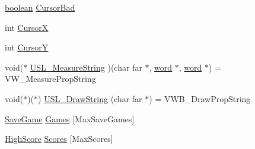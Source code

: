 \begin{DoxyCompactItemize}
\item 
\hyperlink{ID__HEAD_8H_a7c6368b321bd9acd0149b030bb8275ed}{boolean} \hyperlink{ID__US__1_8C_abf5358251c5b519d71e3d8bca8256510}{CursorBad}
\item 
int \hyperlink{ID__US__1_8C_af51730b2758fe5daa55ca8445a8f7c3b}{CursorX}
\item 
int \hyperlink{ID__US__1_8C_a7f5c998973d0526fcb8d52f37e5547da}{CursorY}
\item 
void($\ast$ \hyperlink{ID__US__1_8C_ac392829f8abc2e03447a6abf023352b1}{USL\_\-MeasureString} )(char far $\ast$, \hyperlink{ID__HEAD_8H_abad51e07ab6d26bec9f1f786c8d65bcd}{word} $\ast$, \hyperlink{ID__HEAD_8H_abad51e07ab6d26bec9f1f786c8d65bcd}{word} $\ast$) = VW\_\-MeasurePropString
\item 
void($\ast$)($\ast$) \hyperlink{ID__US__1_8C_a49825cde2ac607e0d17407fb33f14a00}{USL\_\-DrawString} (char far $\ast$) = VWB\_\-DrawPropString
\item 
\hyperlink{structSaveGame}{SaveGame} \hyperlink{ID__US__1_8C_a155f9931f0842c8f97f962eef9cd22f7}{Games} \mbox{[}MaxSaveGames\mbox{]}
\item 
\hyperlink{structHighScore}{HighScore} \hyperlink{ID__US__1_8C_a21091ead46c77ab22e506731e48c8d5e}{Scores} \mbox{[}MaxScores\mbox{]}
\end{DoxyCompactItemize}


